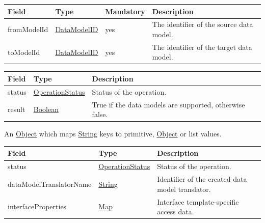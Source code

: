\documentclass[a4paper]{arrowhead}
\newcommand{\pref}[1]{{\textcolor{ArrowheadGrey}{\hyperref[sec:model:primitives:#1]{#1}}}}
\begin{document}
{}
 
\begin{table}[ht!]
\begin{tabularx}{\textwidth}{| p{3.6cm} | p{4.9cm} | p{2cm} | X |} \hline
\rowcolor{gray!33} Field & Type & Mandatory & Description \\ \hline
fromModelId & \pref{DataModelID} & yes & The identifier of the source data model. \\ \hline
toModelId & \pref{DataModelID} & yes & The identifier of the target data model. \\ \hline
\end{tabularx}
\end{table}

 
\begin{table}[ht!]
\begin{tabularx}{\textwidth}{| p{3cm} | p{3cm} | X |} \hline
\rowcolor{gray!33} Field & Type      & Description \\ \hline
status & \pref{OperationStatus} & Status of the operation. \\ \hline
result & \pref{Boolean} & True if the data models are supported, otherwise false. \\ \hline
\end{tabularx}
\end{table}


An \pref{Object} which maps \pref{String} keys to primitive, \pref{Object} or list values.

 
\begin{table}[ht!]
\begin{tabularx}{\textwidth}{| p{4cm} | p{3cm} | X |} \hline
\rowcolor{gray!33} Field & Type      & Description \\ \hline
status & \pref{OperationStatus} & Status of the operation. \\ \hline
dataModelTranslatorName & \pref{String} & Identifier of the created data model translator. \\ \hline
interfaceProperties & \hyperref[sec:model:Map]{Map} & Interface template-specific access data. \\ \hline
\end{tabularx}
\end{table}
\end{document}
